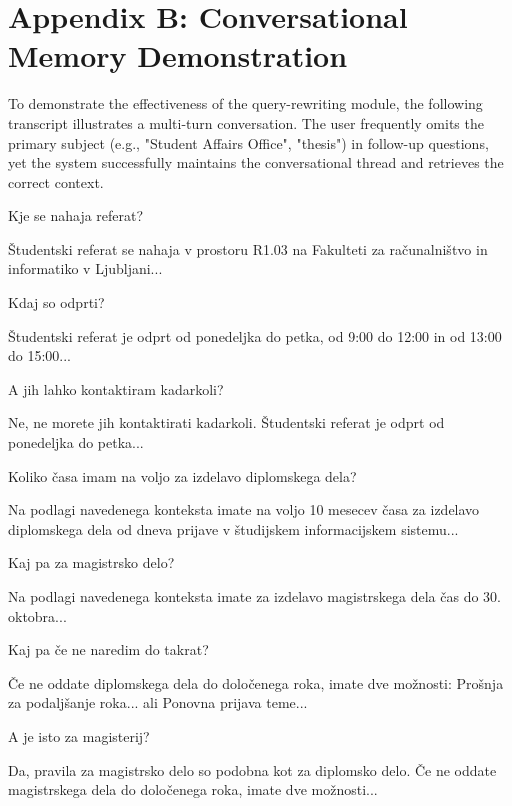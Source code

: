 \documentclass[fleqn,moreauthors,10pt]{ds_report}
\begin{document}
\section*{Appendix B: Conversational Memory Demonstration}
\label{app:memory_transcript}

To demonstrate the effectiveness of the query-rewriting module, the following transcript illustrates a multi-turn conversation. The user frequently omits the primary subject (e.g., "Student Affairs Office", "thesis") in follow-up questions, yet the system successfully maintains the conversational thread and retrieves the correct context.

\begin{description}[style=nextline]
    \item[User:] Kje se nahaja referat?
    \item[ReferatBot:] Študentski referat se nahaja v prostoru R1.03 na Fakulteti za računalništvo in informatiko v Ljubljani...

    \item[User:] Kdaj so odprti?
    \item[ReferatBot:] Študentski referat je odprt od ponedeljka do petka, od 9:00 do 12:00 in od 13:00 do 15:00...

    \item[User:] A jih lahko kontaktiram kadarkoli?
    \item[ReferatBot:] Ne, ne morete jih kontaktirati kadarkoli. Študentski referat je odprt od ponedeljka do petka...

    \item[User:] Koliko časa imam na voljo za izdelavo diplomskega dela?
    \item[ReferatBot:] Na podlagi navedenega konteksta imate na voljo 10 mesecev časa za izdelavo diplomskega dela od dneva prijave v študijskem informacijskem sistemu...

    \item[User:] Kaj pa za magistrsko delo?
    \item[ReferatBot:] Na podlagi navedenega konteksta imate za izdelavo magistrskega dela čas do 30. oktobra...

    \item[User:] Kaj pa če ne naredim do takrat?
    \item[ReferatBot:] Če ne oddate diplomskega dela do določenega roka, imate dve možnosti: Prošnja za podaljšanje roka... ali Ponovna prijava teme...

    \item[User:] A je isto za magisterij?
    \item[ReferatBot:] Da, pravila za magistrsko delo so podobna kot za diplomsko delo. Če ne oddate magistrskega dela do določenega roka, imate dve možnosti...
\end{description}
\end{document}
